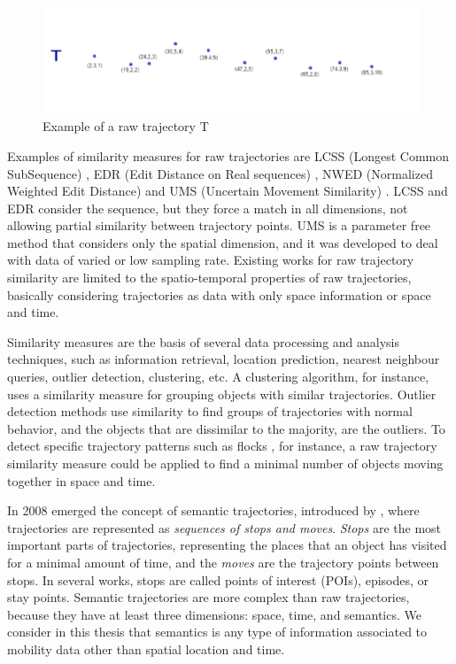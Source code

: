 \begin{figure}[ht]
\centering
\includegraphics[width=1.0\textwidth]{Images/example_raw-trajectory.png}
\caption{Example of a raw trajectory T}
\label{fig:example_raw_trajectory}
\end{figure}

Examples of similarity measures for raw trajectories are LCSS (Longest Common SubSequence) \cite{vlachos2002discovering}, EDR (Edit Distance on Real sequences) \cite{Chen:2005:RFS:1066157.1066213}, NWED (Normalized Weighted Edit Distance) \cite{dodge2012} and UMS (Uncertain Movement Similarity) \cite{Furtado-UMS-2018}. LCSS and EDR consider the sequence, but they force a match in all dimensions, not allowing partial similarity between trajectory points.
UMS is a parameter free method that considers only the spatial dimension, and it was developed to deal with data of varied or low sampling rate.
Existing works for raw trajectory similarity are limited to the spatio-temporal properties of raw trajectories, basically considering trajectories as data with only space information or space and time.

Similarity measures are the basis of several data processing and analysis techniques, such as information retrieval, location prediction, nearest neighbour queries, outlier detection, clustering, etc. A clustering algorithm, for instance, uses a similarity measure for grouping objects with similar trajectories. Outlier detection methods use similarity to find groups of trajectories with normal behavior, and the objects that are dissimilar to the majority, are the outliers. To detect specific trajectory patterns such as flocks \cite{Laube2005}, for instance, a raw trajectory similarity measure could be applied to find a minimal number of objects moving together in space and time.

In 2008 emerged the concept of semantic trajectories, introduced by \cite{Spaccapietra:2008:CVT:1347466.1347785}, where trajectories are represented as \emph{sequences of stops and moves}. \emph{Stops} are the most important parts of trajectories, representing the places that an object has visited for a minimal amount of time, and the \emph{moves} are the trajectory points between stops. In several works, stops are called points of interest (POIs), episodes, or stay points. Semantic trajectories are more complex than raw trajectories, because they have at least three dimensions: space, time, and semantics. {We consider in this thesis that semantics is any type of information associated to mobility data other than spatial location and time.}

